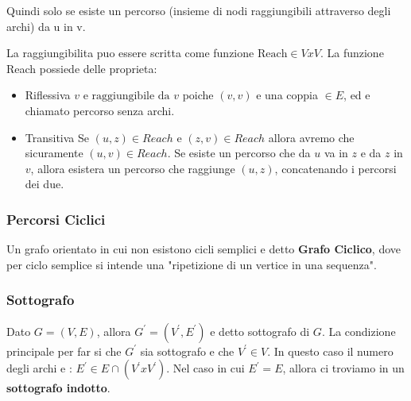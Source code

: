 Quindi solo se esiste un percorso (insieme di nodi raggiungibili attraverso degli archi) da u in v.

La raggiungibilita puo essere scritta come funzione $\text{Reach} \in V x V$. La funzione Reach possiede delle proprieta:
\begin{itemize}
	\item Riflessiva
			$v \text{ e raggiungibile da } v$ poiche $(v,v)$ e una coppia $\in E$, ed e chiamato percorso senza archi. 
	\item Transitiva
			Se $(u,z) \in Reach$ e $(z,v) \in Reach$ allora avremo che sicuramente $(u,v) \in Reach$.
			Se esiste un percorso che da $u$ va in $z$ e da $z$ in $v$, allora esistera un percorso che raggiunge $(u,z)$, concatenando i percorsi dei due.
\end{itemize}  

\subsubsection{Percorsi Ciclici}
Un grafo orientato in cui non esistono cicli semplici e detto \textbf{Grafo Ciclico}, dove per ciclo semplice si intende una "ripetizione di un vertice in una sequenza".


\subsubsection{Sottografo}
Dato $G = (V,E)$, allora $G^{\prime} = (V^{\prime},E^{\prime})$ e detto sottografo di $G$.
La condizione principale per far si che $G^{\prime}$ sia sottografo e che $V^{\prime} \in V$.
In questo caso il numero degli archi e : $E^{\prime} \in E \cap (V^{\prime} x V^{\prime})$.
Nel caso in cui $E^{\prime} = E$, allora ci troviamo in un \textbf{sottografo indotto}.


